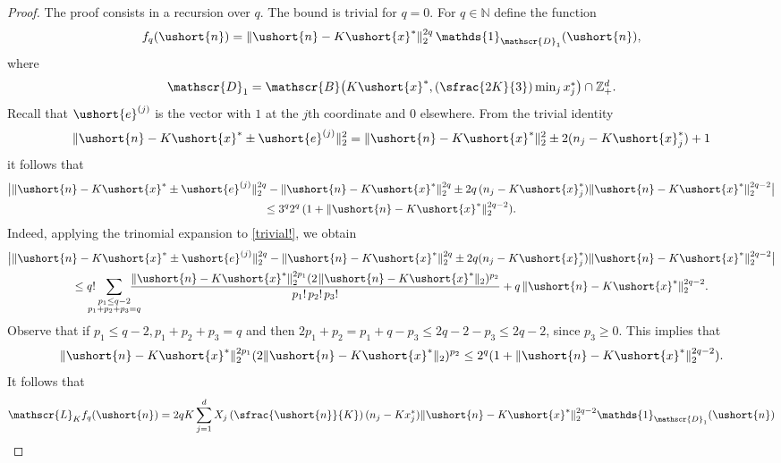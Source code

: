 \documentclass[10pt]{amsart}
\newcommand{\Psfrac}[2]{(\sfrac{#1}{#2})}
\newcommand{\scaleto}[2]{#1}
\let\ts\textstyle
\let\mathcal\mathscr
\numberwithin{equation}{section}
\theoremstyle{plain}
\theoremstyle{definition}
\newcommand{\zentiers}{{\mathbb{Z}}}
\newcommand{\integers}{\mathbb{N}}
\newcommand{\domaine}{\zentiers_{+}^{d}}
\newcommand{\sK}{K}
\newcommand{\gen}{\mathscr{L}_{\sK}}
\newcommand{\un}{\mathds{1}}
\newcommand{\vecn}{\ushort{n}}
\newcommand{\vecxf}{\ushort{x}^*}
\newcommand{\vece}[1]{\ushort{e}^{(#1)}}
\begin{document}
\begin{proof} The proof consists in a recursion over $q$. The bound is trivial for $q=0$.
For $q\in\integers$ define the function
\[
f_q(\vecn)=\|\vecn-K\vecxf\|_{2}^{\scaleto{2q}{5.5pt}} \,\un_{\mathcal{D}_1}(\vecn),
\]
where
\begin{equation*}
\mathcal{D}_1 = \mathcal{B} \bigl(\scaleto{K}{7.5pt}\vecxf, \scaleto{\Psfrac{2K}{3}}{18pt}\ts\min_{j}x^*_{j}\bigr)\cap \domaine.
\end{equation*}
Recall that $\vece{j}$ is the vector with $1$ at the $j$th coordinate and $0$ elsewhere. From the trivial identity
\begin{equation}
\label{trivial!}
\|\vecn - K\vecxf \pm \vece{j}\|_{2}^2 = \|\vecn - K\vecxf\|_{2}^2 \pm 2(n_j -K\vecxf_{j})+1
\end{equation}
it follows that
\begin{multline*}
\big|\|\vecn - K\vecxf \pm \vece{j}\|_{2}^{\scaleto{2q}{5.3pt}} -
\|\vecn - K\vecxf\|_{2}^{\scaleto{2q}{5.3pt}} \pm 2q\, (n_j -K\vecxf_{j})\|\vecn - K\vecxf\|_{2}^{\scaleto{2q-2}{5.3pt}}\big|\\
\leq 3^q 2^q \,(1+\|\vecn - K\vecxf\|_{2}^{\scaleto{2q-2}{5.3pt}}).
\end{multline*}
Indeed, applying the trinomial expansion to \eqref{trivial!}, we obtain
\begin{multline*}
\big|\|\vecn - K\vecxf \pm \vece{j}\|_{2}^{\scaleto{2q}{5.3pt}} -
\|\vecn - K\vecxf\|_{2}^{\scaleto{2q}{5.3pt}} \pm 2q (n_j -K\vecxf_{j})\|\vecn - K\vecxf\|_{2}^{\scaleto{2q-2}{5.3pt}}\big|\\
\leq
q! \hspace*{-3mm}\sum_{\substack{p_{1}\leq q-2\\ p_{1}+p_{2}+p_{3} = q}}\hspace*{-4mm}
\frac{\|\vecn - K\vecxf\|_{2}^{\scaleto{2p_{1}}{5.3pt}} (2\hspace{1pt} \|\vecn - K\vecxf\|_{2})^{p_{2}} }{p_{1}! \, p_{2}! \, p_{3}!}
+ q\, \|\vecn - K\vecxf\|_{2}^{\scaleto{2q-2}{5.3pt}}.
\end{multline*}
Observe that if $p_{1}\leq q-2, p_{1}+p_{2}+p_{3} = q$ and then
$2p_{1}+p_{2} =p_{1}+q-p_{3}\leq 2q -2 -p_{3}\leq 2q-2$, since $p_{3}\geq 0$. This implies that
\[
\|\vecn - K\vecxf\|_{2}^{\scaleto{2p_{1}}{5.3pt}} (2 \|\vecn - K\vecxf\|_{2})^{\scaleto{p_{2}}{4pt}}
\leq 2^q(1+\|\vecn - K\vecxf\|_{2}^{\scaleto{2q-2}{5.3pt}}).
\]
It follows that
\begin{equation}\label{genfq}
\gen f_q(\vecn)=
2q K \sum_{j=1}^d X_j\left(\sfrac{\vecn}{K}\right) (n_j-Kx_j^*) \|\vecn - K\vecxf\|_{2}^{\scaleto{2q-2}{5.3pt}} \un_{\mathcal{D}_1}(\vecn)

\end{equation}
\end{proof}
\end{document}
